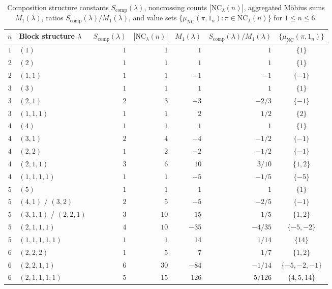 \documentclass[11pt]{article}
\theoremstyle{definition}
\newcommand{\NC}{\mathrm{NC}}
\begin{document}
\begin{table}[ht]
\centering
\caption{Composition structure constants $S_{\mathrm{comp}}(\lambda)$, noncrossing counts $|\NC_\lambda(n)|$, aggregated M\"obius sums $M_1(\lambda)$, ratios $S_{\mathrm{comp}}(\lambda)/M_1(\lambda)$, and value sets $\{\mu_{\NC}(\pi, 1_n) : \pi \in \NC_\lambda(n)\}$ for $1 \le n \le 6$.}\label{tab:comparison}
\small
\begin{tabular}{@{}clrrrrc@{}}
\toprule
$n$ & Block structure $\lambda$ & $S_{\mathrm{comp}}(\lambda)$ & $|\NC_\lambda(n)|$ & $M_1(\lambda)$ & $S_{\mathrm{comp}}(\lambda)/M_1(\lambda)$ & $\{\mu_{\NC}(\pi, 1_n)\}$ \\
\midrule
$1$ & $(1)$             & $1$ & $1$  & $1$   & $1$       & $\{1\}$ \\
$2$ & $(2)$             & $1$ & $1$  & $1$   & $1$       & $\{1\}$ \\
$2$ & $(1,1)$           & $1$ & $1$  & $-1$  & $-1$      & $\{-1\}$ \\
$3$ & $(3)$             & $1$ & $1$  & $1$   & $1$       & $\{1\}$ \\
$3$ & $(2,1)$           & $2$ & $3$  & $-3$  & $-2/3$    & $\{-1\}$ \\
$3$ & $(1,1,1)$         & $1$ & $1$  & $2$   & $1/2$     & $\{2\}$ \\
$4$ & $(4)$             & $1$ & $1$  & $1$   & $1$       & $\{1\}$ \\
$4$ & $(3,1)$           & $2$ & $4$  & $-4$  & $-1/2$    & $\{-1\}$ \\
$4$ & $(2,2)$           & $1$ & $2$  & $-2$  & $-1/2$    & $\{-1\}$ \\
$4$ & $(2,1,1)$         & $3$ & $6$  & $10$  & $3/10$    & $\{1, 2\}$ \\
$4$ & $(1,1,1,1)$       & $1$ & $1$  & $-5$  & $-1/5$    & $\{-5\}$ \\
$5$ & $(5)$             & $1$ & $1$  & $1$   & $1$       & $\{1\}$ \\
$5$ & $(4,1)$ / $(3,2)$ & $2$ & $5$  & $-5$  & $-2/5$    & $\{-1\}$ \\
$5$ & $(3,1,1)$ / $(2,2,1)$ & $3$ & $10$ & $15$ & $1/5$  & $\{1, 2\}$ \\
$5$ & $(2,1,1,1)$       & $4$ & $10$ & $-35$ & $-4/35$   & $\{-5, -2\}$ \\
$5$ & $(1,1,1,1,1)$     & $1$ & $1$  & $14$  & $1/14$    & $\{14\}$ \\
$6$ & $(2,2,2)$         & $1$ & $5$  & $7$   & $1/7$     & $\{1, 2\}$ \\
$6$ & $(2,2,1,1)$       & $6$ & $30$ & $-84$ & $-1/14$   & $\{-5, -2, -1\}$ \\
$6$ & $(2,1,1,1,1)$     & $5$ & $15$ & $126$ & $5/126$   & $\{4, 5, 14\}$ \\
\bottomrule
\end{tabular}
\end{table}
\end{document}
